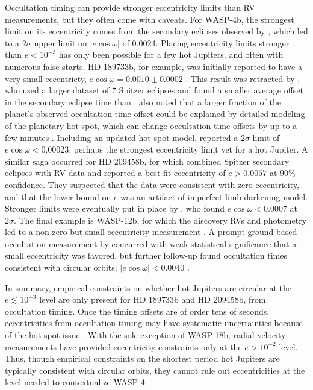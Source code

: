 \documentclass[12pt,twocolumn,tighten]{aastex62}
\begin{document}
Occultation timing can provide stronger eccentricity limits than RV
measurements, but they often come with caveats.  For WASP-4b, the
strongest limit on its eccentricity comes from the secondary eclipses
observed by \citet{beerer_secondary_2011}, which led to a $2\sigma$
upper limit on $| e\cos\omega | $ of 0.0024.
Placing eccentricity limits stronger than $e< 10^{-3}$ has only been
possible for a few hot Jupiters, and often with numerous false-starts.
HD 189733b, for example, was initially reported to have a very small
eccentricty, $e\cos\omega = 0.0010 \pm 0.0002$
\citep{knutson_map_2007}.  This result was retracted by
\citet{agol_climate_2010}, who used a larger dataset of 7 Spitzer
eclipses and found a smaller average offset in the secondary eclipse
time than \citet{knutson_map_2007}.  \citet{agol_climate_2010} also
noted that a larger fraction of the planet's observed occultation time
offset could be explained by detailed modeling of the planetary
hot-spot, which can change occultation time offsets by up to a few
minutes \citep{williams_resolving_2006}.  Including an updated
hot-spot model, \citet{agol_climate_2010} reported a 2$\sigma$ limit
of $e\cos\omega < 0.00023$, perhaps the strongest eccentricity limit
yet for a hot Jupiter.  A similar saga occurred for HD 209458b, for
which \citet{winn_measurement_2005} combined Spitzer secondary
eclipses with RV data and reported a best-fit eccentricity of
$e>0.0057$ at 90\% confidence.  They suspected that the data were
consistent with zero eccentricity, and that the lower bound on $e$ was
an artifact of imperfect limb-darkening model.  Stronger limits were
eventually put in place by \citet{crossfield_spitzer_mips_2012}, who
found $e\cos\omega < 0.0007$ at $2\sigma$.  The final example is
WASP-12b, for which the discovery RVs and photometry led to a non-zero
but small eccentricity measurement \citep[][at
$3\sigma$]{hebb_wasp-12b_2009}.  A prompt ground-based occultation
measurement by \citet{lopez-morales_day-side_2010} concurred with weak
statistical significance that a small eccentricity was favored, but
further follow-up found occultation times consistent with circular
orbits; $| e\cos\omega| < 0.0040 $
\citep{campo_orbit_2011,croll_near-infrared_2011}.

In summary, empirical constraints on whether hot Jupiters are
circular at the $e \lesssim 10^{-3}$ level are only present for HD
189733b and HD 209458b, from occultation timing.  Once the timing
offsets are of order tens of seconds, eccentricities from occultation
timing may have systematic uncertainties because of the hot-spot issue
\citep{williams_resolving_2006,agol_climate_2010}.  With the sole
exception of WASP-18b, radial velocity measurements have provided
eccentricity constraints only at the $e > 10^{-2}$ level.  Thus,
though empirical constraints on the shortest period hot Jupiters are
typically consistent with circular orbits, they cannot rule out
eccentricities at the level needed to contextualize WASP-4.
\end{document}
